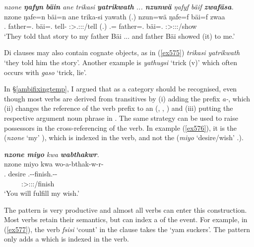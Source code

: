 \begin{exe}
	\ex \emph{nzone \textbf{ŋafyn} \textbf{bäin} ane trikasi \textbf{yatrikwath} ... \textbf{nzunwä} ŋafyf bäif \textbf{zwafäsa}.}\\
	\gll nzone ŋafe=n bäi=n ane trika-si yawath (.) nzun=wä ŋafe=f bäi=f zwaa\\
	\Fsg.\Poss{} father=\Dat.\Sg{} bäi=\Dat.\Sg{} \Dem{} tell-\Nmlz{} \Stpl:\Sbj>\Tsg.\Masc:\Io:\Pst:\Ipfv/tell (.) \Fsg.\Dat=\Emph{} father=\Erg.\Sg{} bäi=\Erg.\Sg{} \Stsg:\Sbj>\Fsg:\Io:\Pst:\Pfv/show\\
	\trans `They told that story to my father Bäi ... and father Bäi showed (it) to me.'\\
	\label{ex575}
\end{exe}

Di clauses may also contain cognate objects, as in (\ref{ex575}) \emph{trikasi yatrikwath} `they told him the story'. Another example is \emph{yathugsi} `trick (v)' which often occurs with \emph{gaso} `trick, lie'.%

In \S{}\ref{ambifixingtemp}, I argued that  as a category should be recognised, even though most  verbs are derived from transitives by (i) adding the  prefix \emph{a-}, which (ii) changes the reference of the verb prefix to an  (, , ) and (iii) putting the respective argument noun phrase in  . The same strategy can be used to raise possessors in the cross-referencing of the verb. In example (\ref{ex576}), it is the  (\emph{nzone} `my' \Fsg), which is indexed in the verb, and not the  (\emph{miyo} `desire/wish' \Tsg.\F).

\begin{exe}
	\ex \emph{\textbf{nzone miyo} kwa \textbf{wabthakwr}.}\\
	\glll nzone miyo kwa wo-a-bthak-w-r-\Zero{}\\
	\Fsg.\Poss{} desire \Fut{} \Fsg.\Alph-\Vc-finish.\Ext-\Lk-\Stsg{}\\
	~ ~ ~ {\Stsg:\Sbj>\Fsg:\Io:\Nonpast:\Ipfv/finish}\\
	\trans `You will fulfill my wish.'
	\label{ex576}
\end{exe}

The  pattern is very productive and almost all  verbs can enter this construction. Most verbs retain their  semantics, but can index a  of the event. For example, in (\ref{ex577}), the verb \emph{fsisi} `count' in the clause takes the  `yam suckers'. The  pattern only adds a  which is indexed in the verb.

